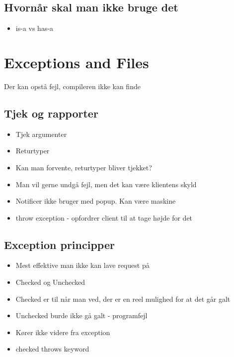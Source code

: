 \subsection{Hvornår skal man ikke bruge det} %
\label{sub:hvorn_r_skal_man_ikke_bruge_det}
\begin{itemize}
    \item is-a vs has-a
\end{itemize}
\newpage
\section{Exceptions and Files} %
\label{sec:exceptions_and_files}
Der kan opstå fejl, compileren ikke kan finde
\subsection{Tjek og rapporter} %
\label{sub:defensive_programming}
\begin{itemize}
    \item Tjek argumenter
    \item Returtyper
    \item Kan man forvente, returtyper bliver tjekket?
    \item Man vil gerne undgå fejl, men det kan være klientens skyld
    \item Notificer ikke bruger med popup. Kan være maskine
    \item throw exception - opfordrer client til at tage højde for det
\end{itemize}
\subsection{Exception principper} %
\label{sub:exception_principper}
\begin{itemize}
    \item Mest effektive man ikke kan lave request på
    \item Checked og Unchecked
    \item Checked er til når man ved, der er en reel mulighed for at det går galt
    \item Unchecked burde ikke gå galt - programfejl
    \item Kører ikke videre fra exception
    \item checked throws keyword
\end{itemize}
